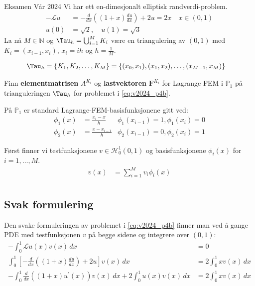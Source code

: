 \begin{example}{Eksamen Vår 2024}{}
	Vi har ett en-dimesjonalt elliptisk randverdi-problem.
	\begin{align*}\label{eq:v2024_p4b}
		-\mathcal{L}u & = -\frac{d}{dx} \left( (1 + x) \frac{du}{dx} \right) + 2u = 2x \quad x \in (0, 1) \\
		u(0)          & = \sqrt{2}, \quad u(1) = \sqrt{3}
	\end{align*}
	La nå \(M \in \mathbb{N}\) og \(\Tau_h = \bigcup_{i=1}^M K_i\) være en triangulering av \((0, 1)\) med \(K_i = (x_{i-1}, x_i)\), \(x_i = ih\) og \(h = \frac{1}{M}\).

	\begin{align*}
		\Tau_h & = \{K_1, K_2, \ldots, K_M\}=\{(x_0, x_1), (x_1, x_2), \ldots, (x_{M-1}, x_M)\}
	\end{align*}

	Finn \textbf{elementmatrisen} $A^{K_i}$ og \textbf{lastvektoren} $\symbf{F}^{K_i}$ for Lagrange FEM i $\mathbb{P}_1$ på trianguleringen $\Tau_h$ for problemet i \eqref{eq:v2024_p4b}.

	På $\mathbb{P}_1$ er standard Lagrange-FEM-basisfunksjonene gitt ved:
	\begin{align*}
		\phi_1(x) & = \frac{x_i - x}{h}     & \phi_1(x_{i-1}) = 1, \phi_1(x_i) = 0 \\
		\phi_2(x) & = \frac{x - x_{i-1}}{h} & \phi_2(x_{i-1}) = 0, \phi_2(x_i) = 1
	\end{align*}

	Først finner vi testfunksjonene \(v \in \mathcal{H}_0^1(0, 1)\) og basisfunksjonene \(\phi_i(x)\) for \(i = 1, \ldots, M\).
	\begin{align*}
		v(x) & = \sum_{i=1}^M v_i \phi_i(x) \\
	\end{align*}
\end{example}
\subsection*{Svak formulering}
Den svake formuleringen av problemet i \eqref{eq:v2024_p4b} finner man ved å gange PDE med testfunksjonen \(v\) på begge sidene og integrere over \((0, 1)\):
\begin{align*}
	-\int_0^1  \mathcal{L}u(x) v(x) \, dx                                                              & = 0                      \\
	\int_0^1  \left[-\frac{d}{dx} \left( (1 + x) \frac{du}{dx} \right) + 2u \right] v(x) \, dx         & = 2\int_0^1 x v(x) \, dx \\
	-\int_0^1 \frac{d}{dx} \left( (1 + x) u^{\prime}(x) \right) v(x) \, dx + 2\int_0^1 u(x) v(x) \, dx & = 2\int_0^1 x v(x) \, dx
\end{align*}

